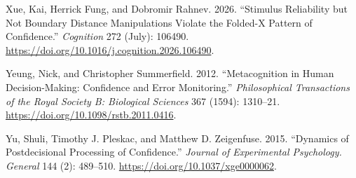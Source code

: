 \documentclass[
]{article}
\newlength{\cslhangindent}
\newenvironment{CSLReferences}[2] %
 {\begin{list}{}{%
  \setlength{\itemindent}{0pt}
  \setlength{\leftmargin}{0pt}
  \setlength{\parsep}{0pt}
  \ifodd #1
   \setlength{\leftmargin}{\cslhangindent}
   \setlength{\itemindent}{-1\cslhangindent}
  \fi
  \setlength{\itemsep}{#2\baselineskip}}}
 {\end{list}}
\begin{document}
\begin{CSLReferences}{1}{1}
Xue, Kai, Herrick Fung, and Dobromir Rahnev. 2026. {``Stimulus
Reliability but Not Boundary Distance Manipulations Violate the
Folded-{X} Pattern of Confidence.''} \emph{Cognition} 272 (July):
106490. \url{https://doi.org/10.1016/j.cognition.2026.106490}.

Yeung, Nick, and Christopher Summerfield. 2012. {``Metacognition in
Human Decision-Making: Confidence and Error Monitoring.''}
\emph{Philosophical Transactions of the Royal Society B: Biological
Sciences} 367 (1594): 1310--21.
\url{https://doi.org/10.1098/rstb.2011.0416}.

Yu, Shuli, Timothy J. Pleskac, and Matthew D. Zeigenfuse. 2015.
{``Dynamics of Postdecisional Processing of Confidence.''} \emph{Journal
of Experimental Psychology. General} 144 (2): 489--510.
\url{https://doi.org/10.1037/xge0000062}.

\end{CSLReferences}
\end{document}
